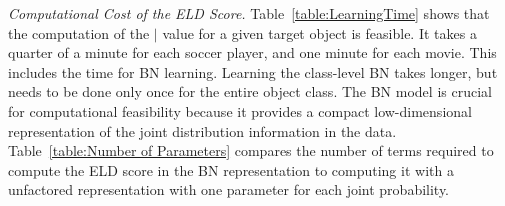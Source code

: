 \documentclass[conference]{IEEEtran}
\begin{document}
						\emph{Computational Cost of the ELD Score.}
%						
%						
						Table~\ref{table:LearningTime} shows that the computation of the $\mid$ value for a given target object is feasible. It takes a quarter of a minute for each soccer player, and one minute for each movie. This includes the time for BN learning. Learning the class-level BN takes longer, but needs to be done only once for the entire object class. The BN model is crucial for computational feasibility because it provides a compact low-dimensional representation of the joint distribution information in the data. Table~\ref{table:Number of Parameters} compares the number of terms required to compute the ELD score in the BN representation to computing it with a unfactored representation with one parameter for each joint probability.
						
\end{document}
